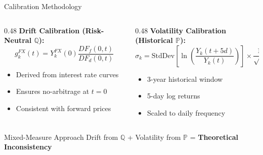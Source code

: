 \documentclass[11pt,aspectratio=169]{beamer}
\begin{document}
	\begin{frame}{Calibration Methodology}
		\begin{columns}[T]
			\begin{column}{0.48\textwidth}
				\textbf{Drift Calibration (Risk-Neutral $\mathbb{Q}$):}
				\begin{equation*}
					g_k^{FX}(t) = Y_k^{FX}(0)\frac{DF_f(0,t)}{DF_d(0,t)}
				\end{equation*}
				
				\begin{itemize}
					\item Derived from interest rate curves
					\item Ensures no-arbitrage at $t=0$
					\item Consistent with forward prices
				\end{itemize}
			\end{column}
			
			\begin{column}{0.48\textwidth}
				\textbf{Volatility Calibration (Historical $\mathbb{P}$):}
				\begin{equation*}
					\sigma_k = \text{StdDev}\left[\ln\!\left(\frac{Y_k(t+5d)}{Y_k(t)}\right)\right] \times \frac{1}{\sqrt{5}}
				\end{equation*}
				
				\begin{itemize}
					\item 3-year historical window
					\item 5-day log returns
					\item Scaled to daily frequency
				\end{itemize}
			\end{column}
		\end{columns}
		
		\vspace{0.3cm}
		
		\begin{alertblock}{Mixed-Measure Approach}
			\centering
			Drift from $\mathbb{Q}$ + Volatility from $\mathbb{P}$ = \textbf{Theoretical Inconsistency}
		\end{alertblock}
	\end{frame}
	
\end{document}
